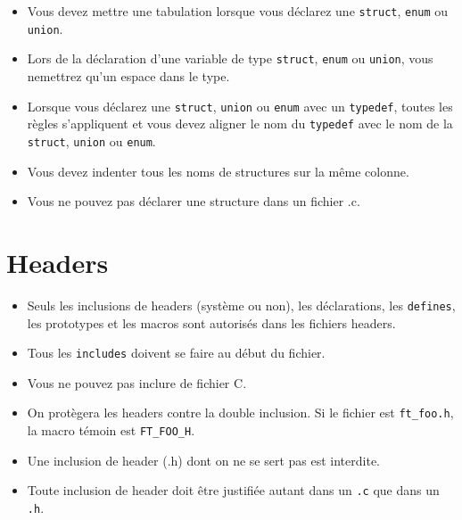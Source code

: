 \documentclass{42-fr}
\begin{document}
        \begin{itemize}

            \item Vous devez mettre une tabulation lorsque vous déclarez une \texttt{struct}, \texttt{enum} ou \texttt{union}.

            \item Lors de la déclaration d’une variable de type \texttt{struct}, \texttt{enum} ou \texttt{union},
                vous nemettrez qu’un espace dans le type.

            \item Lorsque vous déclarez une \texttt{struct}, \texttt{union} ou \texttt{enum} avec un \texttt{typedef},
                toutes les règles s’appliquent et vous devez aligner le nom du \texttt{typedef} 
                avec le nom de la \texttt{struct}, \texttt{union} ou \texttt{enum}.

            \item Vous devez indenter tous les noms de structures sur la même colonne.

            \item Vous ne pouvez pas déclarer une structure dans un fichier .c.

        \end{itemize}
        \newpage


    \section{Headers}

        \begin{itemize}

            \item Seuls les inclusions de headers (système ou non),
                les déclarations, les \texttt{defines}, les prototypes et les macros
                sont autorisés dans les fichiers headers.

            \item Tous les \texttt{includes} doivent se faire au début du fichier.

            \item Vous ne pouvez pas inclure de fichier C.

            \item On protègera les headers contre la double inclusion. Si le fichier est
            \texttt{ft\_foo.h}, la macro témoin est \texttt{FT\_FOO\_H}.

            \item Une inclusion de header (.h) dont on ne se sert pas est interdite.

            \item Toute inclusion de header doit être justifiée autant dans un \texttt{.c}
                que dans un \texttt{.h}.

        \end{itemize}
\end{document}
